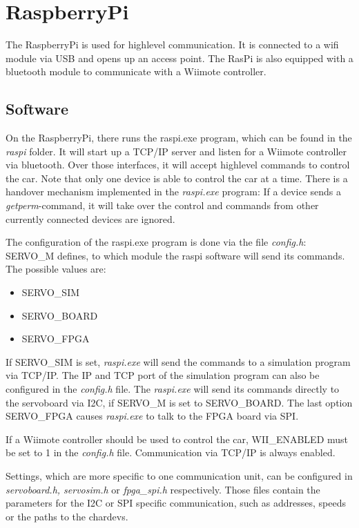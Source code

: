 \documentclass[a4paper
               ,10pt
               ,DIV=10 %
               ,BCOR=0.3cm
               ,pagesize %
               ,headings=small
               ,bibtotoc
               ]
               {scrartcl}
\begin{document}
\section{RaspberryPi}
The RaspberryPi is used for highlevel communication.
It is connected to a wifi module via USB and opens up an access point.
The RasPi is also equipped with a bluetooth module to communicate with a Wiimote controller.

\subsection{Software}
On the RaspberryPi, there runs the raspi.exe program, which can be found in the \textit{raspi} folder.
It will start up a TCP/IP server and listen for a Wiimote controller via bluetooth.
Over those interfaces, it will accept highlevel commands to control the car.
Note that only one device is able to control the car at a time.
There is a handover mechanism implemented in the \textit{raspi.exe} program: If a device sends a \textit{getperm}-command, it will take over the control and commands from other currently connected devices are ignored.


The configuration of the raspi.exe program is done via the file \textit{config.h}:
SERVO\_M defines, to which module the raspi software will send its commands. The possible values are:
\begin{itemize}
\item{SERVO\_SIM}
\item{SERVO\_BOARD}
\item{SERVO\_FPGA}
\end{itemize}

If SERVO\_SIM is set, \textit{raspi.exe} will send the commands to a simulation program via TCP/IP.
The IP and TCP port of the simulation program can also be configured in the \textit{config.h} file.
The \textit{raspi.exe} will send its commands directly to the servoboard via I2C, if SERVO\_M is set to SERVO\_BOARD.
The last option SERVO\_FPGA causes \textit{raspi.exe} to talk to the FPGA board via SPI.

If a Wiimote controller should be used to control the car, WII\_ENABLED must be set to 1 in the \textit{config.h} file.
Communication via TCP/IP is always enabled.

Settings, which are more specific to one communication unit, can be configured in \textit{servoboard.h, servosim.h} or \textit{fpga\_spi.h} respectively. Those files contain the parameters for the I2C or SPI specific communication, such as addresses, speeds or the paths to the chardevs.
\end{document}
